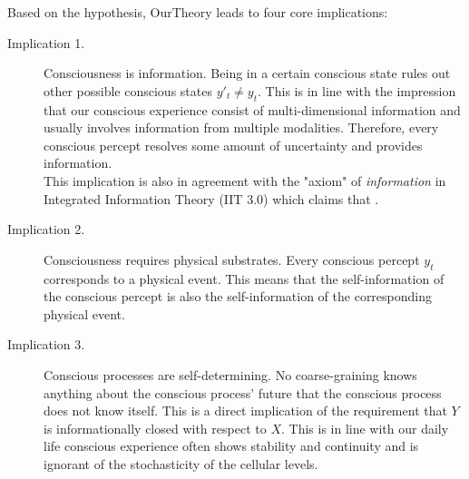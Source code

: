 \documentclass[utf8]{article}
\begin{document}
        Based on the hypothesis, \ac{OurTheory} leads to four core implications: 
        \begin{description}
            \item[Implication 1.] Consciousness is information. Being in a certain conscious state rules out other possible conscious states $y'_t\neq y_t$. This is in line with the impression that our conscious experience consist of multi-dimensional information and usually involves information from multiple modalities. Therefore, every conscious percept resolves some amount of uncertainty and provides information. \\ 
            This implication is also in agreement with the "axiom" of \textit{information} in Integrated Information Theory (IIT 3.0) which claims that  \citep[p.2]{oizumi2014phenomenology}.
            
            \item[Implication 2.] Consciousness requires physical substrates.  Every conscious percept $y_t$ corresponds to a physical event. This means that the self-information of the conscious percept is also the self-information of the corresponding physical event. 
            
            
            \item[Implication 3.] Conscious processes are self-determining. 
            No coarse-graining knows anything about the conscious process' future that the conscious process does not know itself. This is a direct implication of the requirement that $Y$ is informationally closed with respect to $X$. This is in line with our daily life conscious experience often shows stability and continuity and is ignorant of the stochasticity of the cellular levels. 
            
            

\end{description}
\end{document}
